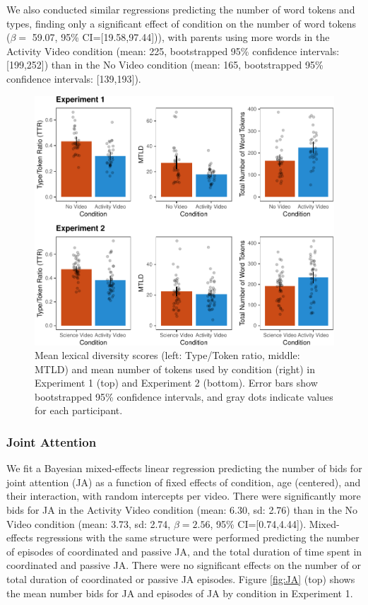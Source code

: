 \documentclass[man,floatsintext]{apa6}
\begin{document}
We also conducted similar regressions predicting the number of word tokens and types, finding only a significant effect of condition on the number of word tokens (\(\beta=\) 59.07, 95\% CI={[}19.58,97.44{]})), with parents using more words in the Activity Video condition (mean: 225, bootstrapped 95\% confidence intervals: {[}199,252{]}) than in the No Video condition (mean: 165, bootstrapped 95\% confidence intervals: {[}139,193{]}).

\begin{figure}[H]

{\centering \includegraphics{figs/fig-lexdiv-1} 

}

\caption{\label{fig:lexdiv} Mean lexical diversity scores (left: Type/Token ratio, middle: MTLD) and mean number of tokens used by condition (right) in Experiment 1 (top) and Experiment 2 (bottom). Error bars show bootstrapped 95\% confidence intervals, and gray dots indicate values for each participant.}\label{fig:fig-lexdiv}
\end{figure}

\hypertarget{joint-attention}{%
\subsubsection{Joint Attention}\label{joint-attention}}

We fit a Bayesian mixed-effects linear regression predicting the number of bids for joint attention (JA) as a function of fixed effects of condition, age (centered), and their interaction, with random intercepts per video.
There were significantly more bids for JA in the Activity Video condition (mean: 6.30, sd: 2.76) than in the No Video condition (mean: 3.73, sd: 2.74, \(\beta=2.56\), 95\% CI={[}0.74,4.44{]}).
Mixed-effects regressions with the same structure were performed predicting the number of episodes of coordinated and passive JA, and the total duration of time spent in coordinated and passive JA.
There were no significant effects on the number of or total duration of coordinated or passive JA episodes.
Figure \ref{fig:JA} (top) shows the mean number bids for JA and episodes of JA by condition in Experiment 1.
\end{document}
